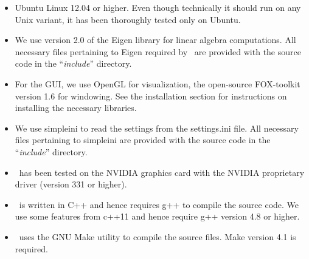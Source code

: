 \documentclass[10pt]{article}
\begin{document}
\begin{itemize} 
  \item Ubuntu Linux 12.04 or higher. Even though technically it should run on
		  any Unix variant, it has been thoroughly tested only on Ubuntu.
  \item We use version 2.0 of the Eigen library for linear algebra
		  computations. All necessary files pertaining to Eigen required by
		  \EASAL~are provided with the source code in the ``\emph{include}''
		  directory.  \item For the GUI, we use OpenGL for visualization, the
		  open-source FOX-toolkit version 1.6 for windowing. See the
		  installation section for instructions on installing the necessary
		  libraries.  \item We use simpleini to read the settings from the
		  settings.ini file. All necessary files pertaining to simpleini are
		  provided with the source code in the ``\emph{include}'' directory.
  \item \EASAL~has been tested on the NVIDIA graphics card with the NVIDIA
		  proprietary driver (version 331 or higher).  \item \EASAL~is written
		  in C++ and hence requires g++ to compile the source code. We use some
		  features from c++11 and hence require g++ version 4.8 or higher.
  \item \EASAL~uses the GNU Make utility to compile the source files. Make
		  version 4.1 is required.
\end{itemize}

 
\end{document}

